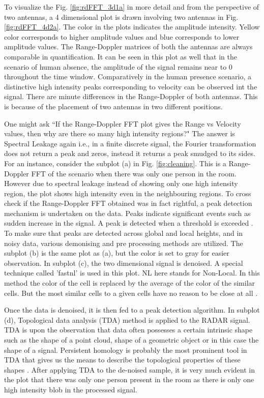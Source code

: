 To visualize the Fig. \ref{fig:rdFFT_3d1a} in more detail and from the perspective of two antennas, a 4 dimensional plot is drawn involving two antennas in Fig. \ref{fig:rdFFT_4d2a}. The color in the plots indicates the amplitude intensity. Yellow color corresponds to higher amplitude values and blue corresponds to lower amplitude values. The Range-Doppler matrices of both the antennas are always comparable in quantification. It can be seen in this plot as well that in the scenario of human absence, the amplitude of the signal remains near to 0 throughout the time window. Comparatively in the human presence scenario, a distinctive high intensity peaks corresponding to velocity can be observed int the signal. There are minute differences in the Range-Doppler of both antennas. This is because of the placement of two antennas in two different positions.

One might ask ``If the Range-Doppler FFT plot gives the Range vs Velocity values, then why are there so many high intensity regions?" The answer is Spectral Leakage again i.e., in a finite discrete signal, the Fourier transformation does not return a peak and zeros, instead it returns a peak smudged to its sides. For an instance, consider the subplot (a) in Fig. \ref{fig:cleaning}. This is a Range-Doppler FFT of the scenario when there was only one person in the room. However due to spectral leakage instead of showing only one high intensity region, the plot shows high intensity even in the neighbouring regions. 
To cross check if the Range-Doppler FFT obtained was in fact rightful, a peak detection mechanism is undertaken on the data. Peaks indicate significant events such as sudden increase in the signal. A peak is detected when a threshold is exceeded \cite{felinger1998data}. To make sure that peaks are detected across global and local heights, and in noisy data, various demonising and pre processing methods are utilized. The subplot (b) is the same plot as (a), but the color is set to gray for easier observation. In subplot (c), the two dimensional signal is denoised. A special technique called 'fastnl' is used in this plot. NL here stands for Non-Local. In this method the color of the cell is replaced by the average of the color of the similar cells. But the most similar cells to a given cells have no reason to be close at all \cite{ipol2011bcmnlm}.

Once the data is denoised, it is then fed to a peak detection algorithm. In subplot (d), Topological data analysis (TDA) method is applied to the RADAR signal. TDA is upon the observation that data often possesses a certain intrinsic shape such as the shape of a point cloud, shape of a geometric object or in this case the shape of a signal. Persistent homology is probably the most prominent tool in TDA that gives us the means to describe the topological properties of these shapes \cite{edelsbrunner2010computational}. After applying TDA to the de-noised sample, it is very much evident in the plot that there was only one person present in the room as there is only one high intensity blob in the processed signal.


